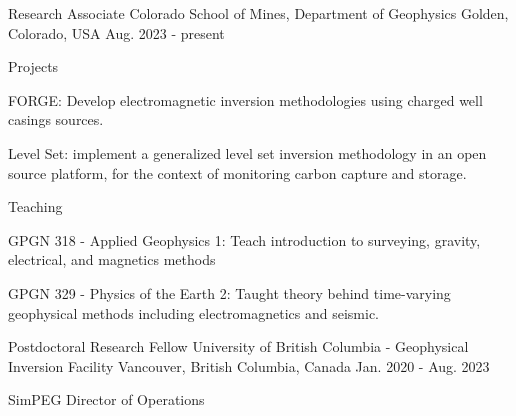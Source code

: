 

\begin{cventries}
  \cventry
  {Research Associate}
  {Colorado School of Mines, Department of Geophysics}
  {Golden, Colorado, USA}
  {Aug. 2023 - present}
  {
    \begin{cvparagraph}
     Projects
     \vspace{7pt}
     \end{cvparagraph}
  \begin{cvitems}
    \item{FORGE: Develop electromagnetic inversion methodologies using charged well casings sources.}
    \item{Level Set: implement a generalized level set inversion methodology in an open source platform, for the context of
    monitoring carbon capture and storage.
    }
    \vspace{10pt}
    \end{cvitems}
    \begin{cvparagraph}
      \vspace{7pt}
     Teaching
     \vspace{7pt}
     \end{cvparagraph}
  \begin{cvitems}
    \item {GPGN 318 - Applied Geophysics 1: Teach introduction to surveying, gravity, electrical, and magnetics methods}
    \item {GPGN 329 - Physics of the Earth 2: Taught theory behind time-varying geophysical methods including electromagnetics and seismic.}
    \vspace{10pt}
    \end{cvitems}
  }
\cventry
    {Postdoctoral Research Fellow} %
    {University of British Columbia - Geophysical Inversion Facility} %
    {Vancouver, British Columbia, Canada} %
    {Jan. 2020 - Aug. 2023} %
    {\begin{cvparagraph}
      SimPEG Director of Operations
      \vspace{7pt}
      \end{cvparagraph}
      \begin{cvitems} %

\end{cvitems}}
\end{cventries}
